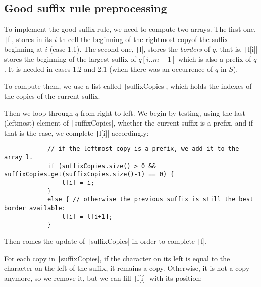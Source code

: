 \documentclass[a4paper,11pt,openany,extrafontsizes,twoside,article]{memoir}
\begin{document}
\subsection{Good suffix rule preprocessing}
\label{sec:good-suffix-rule-1}

To implement the good suffix rule, we need to compute two arrays. The
first one, \texttt|f|, stores in its $i$-th cell the
beginning of the rightmost copyof the suffix beginning at $i$ (case
1.1). The second one, \texttt|l|, stores the \emph{borders}
of $q$, that is, \texttt|l[i]| stores the beginning of the
largest suffix of $q[i..m-1]$ which is also a prefix of $q$. It is
needed in cases 1.2 and 2.1 (when there was an occurrence of $q$ in
$S$).

To compute them, we use a list called \texttt|suffixCopies|,
which holds the indexes of the copies of the current suffix.

Then we loop through $q$ from right to left. We begin by testing,
using the last (leftmost) element of \texttt|suffixCopies|,
whether the current suffix is a prefix, and if that is the case, we
complete \texttt|l[i]| accordingly:

\begin{verbatim}
            // if the leftmost copy is a prefix, we add it to the array l.
            if (suffixCopies.size() > 0 && suffixCopies.get(suffixCopies.size()-1) == 0) {
                l[i] = i;
            }
            else { // otherwise the previous suffix is still the best border available:
                l[i] = l[i+1];
            }
\end{verbatim}

Then comes the update of \texttt|suffixCopies| in order to
complete \texttt|f|.

For each copy in \texttt|suffixCopies|, if the character on
its left is equal to the character on the left of the suffix, it
remains a copy. Otherwise, it is not a copy anymore, so we remove it,
but we can fill \texttt|f[i]| with its position:
\end{document}
